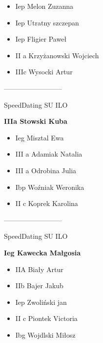 \documentclass[a4paper,10pt]{article}
\begin{document}
\begin{multicols}{3}
\begin{minipage}[l]{\textwidth}
  \begin{itemize}
    \item Iep Melon Zuzanna
    \item Iep Utratny szczepan
    \item Iep Fligier Paweł
    \item II a Krzyżanowski Wojciech
    \item IIIc Wysocki Artur

    \end{itemize}



\end{minipage}



\begin{minipage}[l]{\textwidth}
--------------------------

  \footnotesize{SpeedDating SU ILO}

  \bfseries{IIIa Stowski Kuba}

  \begin{itemize}
    \item Ieg Misztal Ewa
    \item III a Adamiak Natalia
    \item III a Odrobina Julia
    \item Ibp Woźniak Weronika
    \item II c Koprek Karolina

    \end{itemize}



\end{minipage}



\begin{minipage}[l]{\textwidth}
--------------------------

  \footnotesize{SpeedDating SU ILO}

  \bfseries{Ieg Kawecka Małgosia}

  \begin{itemize}
    \item IIA Biały Artur
    \item IIb Bajer Jakub
    \item Iep Zwoliński jan
    \item II c Piontek Victoria
    \item Ibg Wojdlski Miłosz

    \end{itemize}




\end{minipage}
\end{multicols}
\end{document}
